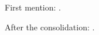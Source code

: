\documentclass[letterpaper, 12pt]{article}
\begin{document}
\doublespacing
First mention: \citet{kamstra2003winter}.

After the consolidation: \citet{kamstra2003winter,kamstra2015seasonal}.

\end{document}
